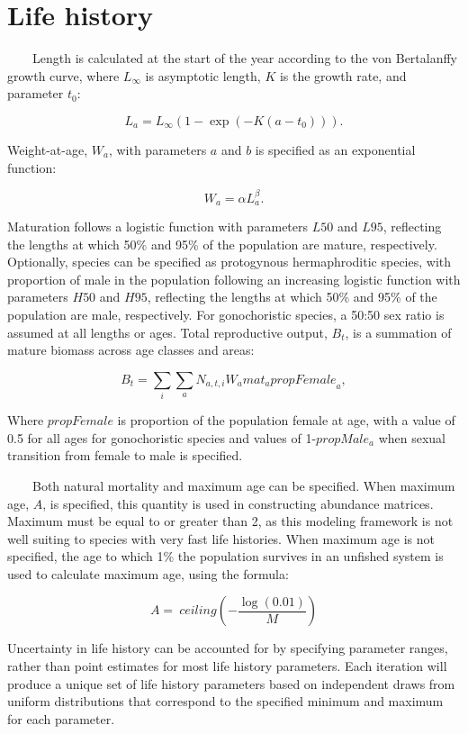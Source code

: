 \documentclass[
]{book}
\begin{document}
\section{Life history}\label{life-history}

~~~~Length is calculated at the start of the year according to the von Bertalanffy growth curve, where \(L_\infty\) is asymptotic length, \(K\) is the growth rate, and parameter \(t_0\):

\[
L_a = L_\infty \left(1- \exp{\left(-K\left(a - t_0\right)\right)}\right). \tag{eq. 9} \label{eq:nineth}
\]

Weight-at-age, \(W_a\), with parameters \(a\) and \(b\) is specified as an exponential function:

\[
W_a=\alpha L_a^\beta. \tag{eq. 10} \label{eq:tenth}
\]

Maturation follows a logistic function with parameters \(L50\) and \(L95\), reflecting the lengths at which 50\% and 95\% of the population are mature, respectively. Optionally, species can be specified as protogynous hermaphroditic species, with proportion of male in the population following an increasing logistic function with parameters \(H50\) and \(H95\), reflecting the lengths at which 50\% and 95\% of the population are male, respectively. For gonochoristic species, a 50:50 sex ratio is assumed at all lengths or ages. Total reproductive output, \(B_t\), is a summation of mature biomass across age classes and areas:

\[
B_t=\sum_{i}\sum_{a}{N_{a,t,i}W_a\mathit{mat}_a{propFemale}_a}, \tag{eq. 11} \label{eq:eleventh}
\]

Where \(propFemale\) is proportion of the population female at age, with a value of 0.5 for all ages for gonochoristic species and values of 1-\(propMale_a\) when sexual transition from female to male is specified.\\
\strut ~~~~Both natural mortality and maximum age can be specified. When maximum age, \(A\), is specified, this quantity is used in constructing abundance matrices. Maximum must be equal to or greater than 2, as this modeling framework is not well suiting to species with very fast life histories. When maximum age is not specified, the age to which 1\% the population survives in an unfished system is used to calculate maximum age, using the formula:

\[
A=\ ceiling\left(-\frac{\log{\left(0.01\right)}}{M}\right) \tag{eq. 12} \label{eq:twelftth}
\]

Uncertainty in life history can be accounted for by specifying parameter ranges, rather than point estimates for most life history parameters. Each iteration will produce a unique set of life history parameters based on independent draws from uniform distributions that correspond to the specified minimum and maximum for each parameter.
\end{document}

